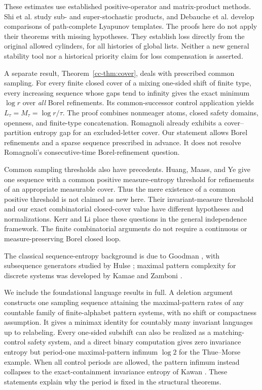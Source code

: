 \documentclass[11pt,reqno]{amsart}
\numberwithin{equation}{section}
\theoremstyle{definition}
\begin{document}
These estimates use established positive-operator and matrix-product
methods. Shi et al. \cite{Shi2021} study sub- and super-stochastic
products, and Debauche et al. \cite{Debauche2022} develop comparisons
of path-complete Lyapunov templates. The proofs here do not apply their
theorems with missing hypotheses. They establish loss directly from
the original allowed cylinders, for all histories of global lists.
Neither a new general stability tool nor a historical priority claim
for loss compensation is asserted.

A separate result, Theorem~\ref{cc-thm:cover}, deals with prescribed
common sampling. For every finite closed cover of a mixing one-sided
shift of finite type, every increasing sequence whose gaps tend to
infinity gives the exact minimum $\log r$ over \emph{all} Borel
refinements. Its common-successor control application yields
$L_\tau=M_\tau=\log r/\tau$. The proof combines nonmeager atoms,
closed safety domains, openness, and finite-type concatenation.
Romagnoli \cite{Romagnoli2007} already exhibits a cover--partition
entropy gap for an excluded-letter cover. Our statement allows Borel
refinements and a sparse sequence prescribed in advance. It does not
resolve Romagnoli's consecutive-time Borel-refinement question.

Common sampling thresholds also have precedents. Huang, Maass, and Ye
\cite[Lemma~3.3 and Theorem~3.5]{HuangMaassYe2004} give one sequence
with a common positive measure-entropy threshold for refinements of
an appropriate measurable cover. Thus the mere existence of a common
positive threshold is not claimed as new here. Their invariant-measure
threshold and our exact combinatorial closed-cover value have different
hypotheses and normalizations. Kerr and Li \cite{KL2007,KL2009}
place these questions in the general independence framework. The
finite combinatorial arguments do not require a continuous or
measure-preserving Borel closed loop.

The classical sequence-entropy background is due to Goodman
\cite{Goodman1974}, with subsequence generators studied by Hulse
\cite{Hulse1982}; maximal pattern complexity for discrete systems
was developed by Kamae and Zamboni \cite{KamaeZamboniSystems2002}.

We include the foundational language results in full. A deletion
argument constructs one sampling sequence attaining the maximal-pattern
rates of any countable family of finite-alphabet pattern systems, with
no shift or compactness assumption. It gives a minimax identity for
countably many invariant languages up to relabeling. Every one-sided
subshift can also be realized as a matching-control safety system,
and a direct binary computation gives zero invariance entropy but
period-one maximal-pattern infimum $\log2$ for the Thue--Morse example.
When all control periods are allowed, the pattern infimum instead
collapses to the exact-containment invariance entropy of Kawan
\cite{Kawan2013}. These statements explain why the period is fixed in
the structural theorems.
\end{document}
